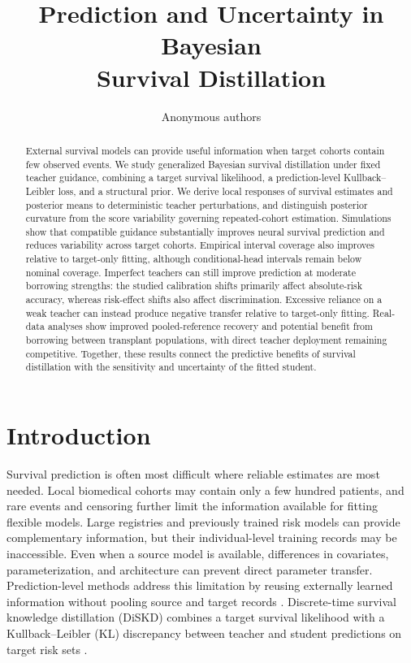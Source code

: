 \documentclass{article} %
\title{Prediction and Uncertainty in Bayesian\\Survival Distillation}
\author{Anonymous authors}
\begin{document}
\maketitle

\begin{abstract}
External survival models can provide useful information when target cohorts contain few observed events. We study generalized Bayesian survival distillation under fixed teacher guidance, combining a target survival likelihood, a prediction-level Kullback--Leibler loss, and a structural prior. We derive local responses of survival estimates and posterior means to deterministic teacher perturbations, and distinguish posterior curvature from the score variability governing repeated-cohort estimation. Simulations show that compatible guidance substantially improves neural survival prediction and reduces variability across target cohorts. Empirical interval coverage also improves relative to target-only fitting, although conditional-head intervals remain below nominal coverage. Imperfect teachers can still improve prediction at moderate borrowing strengths: the studied calibration shifts primarily affect absolute-risk accuracy, whereas risk-effect shifts also affect discrimination. Excessive reliance on a weak teacher can instead produce negative transfer relative to target-only fitting. Real-data analyses show improved pooled-reference recovery and potential benefit from borrowing between transplant populations, with direct teacher deployment remaining competitive. Together, these results connect the predictive benefits of survival distillation with the sensitivity and uncertainty of the fitted student.
\end{abstract}

\section{Introduction}
Survival prediction is often most difficult where reliable estimates are most needed. Local biomedical cohorts may contain only a few hundred patients, and rare events and censoring further limit the information available for fitting flexible models. Large registries and previously trained risk models can provide complementary information, but their individual-level training records may be inaccessible. Even when a source model is available, differences in covariates, parameterization, and architecture can prevent direct parameter transfer. Prediction-level methods address this limitation by reusing externally learned information without pooling source and target records \citep{hickey2024recast,lu2026adaptive}. Discrete-time survival knowledge distillation (DiSKD) combines a target survival likelihood with a Kullback--Leibler (KL) discrepancy between teacher and student predictions on target risk sets \citep{deng2026diskd}.
\end{document}
